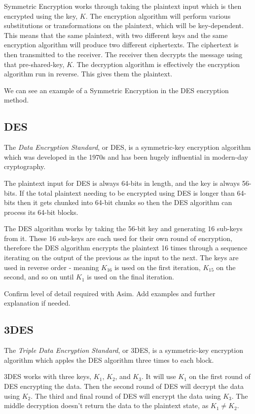 Symmetric Encryption works through taking the plaintext input which is then encrypted using the key, $K$. The encryption algorithm will perform various substitutions or transformations on the plaintext, which will be key-dependent. This means that the same plaintext, with two different keys and the same encryption algorithm will produce two different ciphertexts. The ciphertext is then transmitted to the receiver. The receiver then decrypts the message using that pre-shared-key, $K$. The decryption algorithm is effectively the encryption algorithm run in reverse. This gives them the plaintext. 

We can see an example of a Symmetric Encryption in the DES encryption method.

\subsection{DES}
The \textit{Data Encryption Standard}, or DES, is a symmetric-key encryption algorithm which was developed in the 1970s and has been hugely influential in modern-day cryptography.

The plaintext input for DES is always 64-bits in length, and the key is always 56-bits. If the total plaintext needing to be encrypted using DES is longer than 64-bits then it gets chunked into 64-bit chunks so then the DES algorithm can process its 64-bit blocks. 

The DES algorithm works by taking the 56-bit key and generating 16 sub-keys from it. These 16 sub-keys are each used for their own round of encryption, therefore the DES algorithm encrypts the plaintext 16 times through a sequence iterating on the output of the previous as the input to the next. The keys are used in reverse order - meaning $K_{16}$ is used on the first iteration, $K_{15}$ on the second, and so on until $K_1$ is used on the final iteration. 

\begin{todo}
Confirm level of detail required with Asim. Add examples and further explanation if needed.
\end{todo}

\subsection{3DES}
The \textit{Triple Data Encryption Standard}, or 3DES, is a symmetric-key encryption algorithm which apples the DES algorithm three times to each block. 

3DES works with three keys, $K_1$, $K_2$, and $K_3$. It will use $K_1$ on the first round of DES encrypting the data. Then the second round of DES will decrypt the data using $K_2$. The third and final round of DES will encrypt the data using $K_3$. The middle decryption doesn't return the data to the plaintext state, as $K_1 \neq K_2$. 

